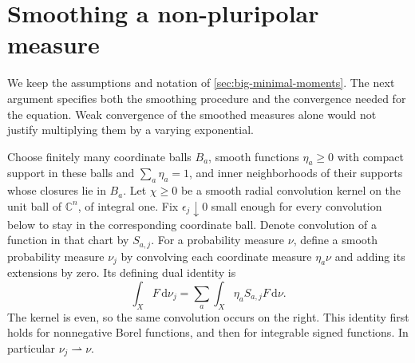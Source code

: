 \section{Smoothing a non-pluripolar measure}
\label{sec:big-measure-smoothing}

We keep the assumptions and notation of \cref{sec:big-minimal-moments}. The next argument specifies both the smoothing procedure and the convergence needed for the equation. Weak convergence of the smoothed measures alone would not justify multiplying them by a varying exponential.

Choose finitely many coordinate balls $B_a$, smooth functions $\eta_a\geq0$ with compact support in these balls and $\sum_a\eta_a=1$, and inner neighborhoods of their supports whose closures lie in $B_a$. Let $\chi\geq0$ be a smooth radial convolution kernel on the unit ball of $\mathbb C^n$, of integral one. Fix $\epsilon_j\downarrow0$ small enough for every convolution below to stay in the corresponding coordinate ball. Denote convolution of a function in that chart by $S_{a,j}$. For a probability measure $\nu$, define a smooth probability measure $\nu_j$ by convolving each coordinate measure $\eta_a\nu$ and adding its extensions by zero. Its defining dual identity is
\begin{equation}\label{eq:measure-smoothing-duality}
 \int_X F\,\mathrm{d}\nu_j
 =\sum_a\int_X\eta_a S_{a,j}F\,\mathrm{d}\nu.
\end{equation}
The kernel is even, so the same convolution occurs on the right. This identity first holds for nonnegative Borel functions, and then for integrable signed functions. In particular $\nu_j\rightharpoonup\nu$.

